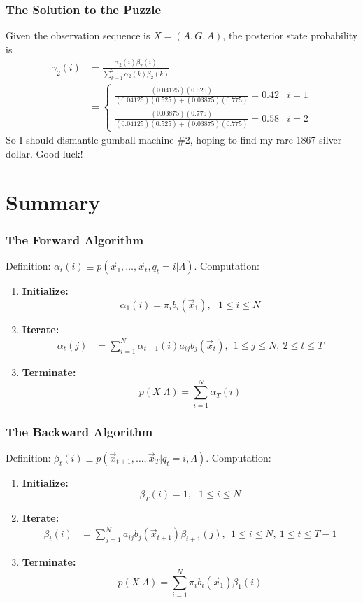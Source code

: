 \documentclass{beamer}
\begin{document}
\begin{frame}
  \frametitle{The Solution to the Puzzle}

  Given the observation sequence is $X=(A,G,A)$, 
  the posterior state probability is
  \begin{align*}
    \gamma_2(i)&=\frac{\alpha_2(i)\beta_2(i)}{\sum_{k=1}^2\alpha_2(k)\beta_2(k)}\\
    &= \begin{cases}
      \frac{(0.04125)(0.525)}{(0.04125)(0.525)+(0.03875)(0.775)}
      = 0.42 & i=1\\
      \frac{(0.03875)(0.775)}{(0.04125)(0.525)+(0.03875)(0.775)}
      = 0.58 & i=2
    \end{cases}
  \end{align*}
  So I should dismantle gumball machine \#2, hoping to find my rare
  1867 silver dollar.  Good luck!
\end{frame}

\section[Summary]{Summary}
\setcounter{subsection}{1}

\begin{frame}
  \frametitle{The Forward Algorithm}

  Definition: $\alpha_t(i) \equiv p(\vec{x}_1,\ldots,\vec{x}_t,q_t=i|\Lambda)$.  Computation:
  \begin{enumerate}
  \item {\bf Initialize:}
    \[
    \alpha_1(i) = \pi_i b_i(\vec{x}_1),~~~1\le i\le N
    \]
  \item {\bf Iterate:}
    \begin{align*}
      \alpha_{t}(j) &= \sum_{i=1}^N \alpha_{t-1}(i) a_{ij}b_j(\vec{x}_t),~~1\le j\le N,~2\le t\le T
    \end{align*}
  \item {\bf Terminate:}
    \[
    p(X|\Lambda) = \sum_{i=1}^N \alpha_T(i)
    \]
  \end{enumerate}
\end{frame}
  
\begin{frame}
  \frametitle{The Backward Algorithm}

  Definition: $\beta_t(i) \equiv p(\vec{x}_{t+1},\ldots,\vec{x}_T|q_t=i,\Lambda)$.  Computation:
  \begin{enumerate}
  \item {\bf Initialize:}
    \[
    \beta_T(i) = 1,~~~1\le i\le N
    \]
  \item {\bf Iterate:}
    \begin{align*}
      \beta_{t}(i) &= \sum_{j=1}^N a_{ij}b_j(\vec{x}_{t+1})\beta_{t+1}(j),~~1\le i\le N,~1\le t\le T-1
    \end{align*}
  \item {\bf Terminate:}
    \[
    p(X|\Lambda) = \sum_{i=1}^N \pi_ib_i(\vec{x}_1)\beta_1(i)
    \]
  \end{enumerate}
\end{frame}
\end{document}
